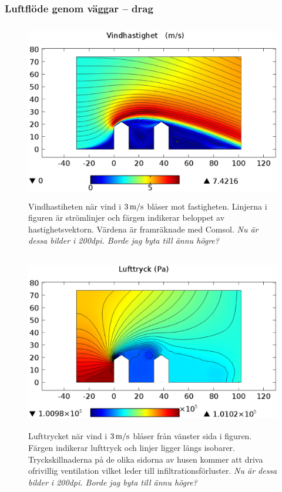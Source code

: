 \subsubsection{Luftflöde genom väggar – drag}

\begin{figure}[hpbt]
\centering
\includegraphics[width=130mm,height=78mm]{images/wind3mshdpi.eps}
\caption{Vindhastiheten när vind i $\unit[3]{ m/s}$ blåser mot fastigheten. Linjerna
i figuren är strömlinjer och färgen indikerar beloppet av hastighetsvektorn. Värdena är framräknade med Comsol.\emph{\color{red} Nu är dessa bilder i 200dpi. Borde jag byta till ännu högre?}}
\end{figure}

\begin{figure}[hpbt]
\centering
\includegraphics[width=130mm,height=78mm]{images/pressure3mshdpi.eps}
\caption{Lufttrycket när vind i $\unit[3]{ m/s}$ blåser från vänster
sida i figuren. Färgen indikerar lufttryck och linjer ligger längs isobarer.
Tryckskillnaderna på de olika sidorna av husen kommer att driva ofrivillig ventilation vilket leder till infiltrationsförluster.\emph{\color{red} Nu är dessa bilder i 200dpi. Borde jag byta till ännu högre?}}
\end{figure}


